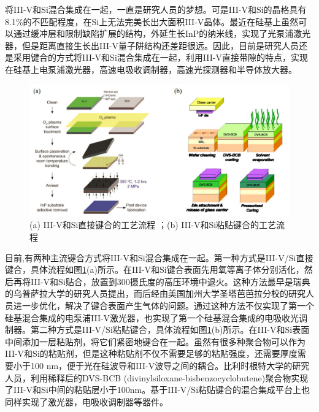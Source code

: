 将III-V和Si混合集成在一起，一直是研究人员的梦想。可是III-V和Si的晶格具有8.1\%的不匹配程度，在Si上无法完美长出大面积III-V晶体。最近在硅基上虽然可以通过缓冲层和限制缺陷扩展的结构，外延生长InP的纳米线，实现了光泵浦激光器\cite{wang2015room}，但是距离直接生长出III-V量子阱结构还差距很远。因此，目前是研究人员还是采用键合的方式将III-V和Si混合集成在一起，利用III-V直接带隙的特点，实现在硅基上电泵浦激光器，高速电吸收调制器，高速光探测器和半导体放大器\cite{liang2010hybrid,roelkens2010iii,liang2010recent,duan2014hybrid}。

\begin{figure}[htb]
	\centering
	\includegraphics[width=14cm]{./Pictures/fig_bonding_methods.jpg}
	\caption{ (a) III-V和Si直接键合的工艺流程 \cite{liang2010hybrid, roelkens2010iii}；(b) III-V和Si粘贴键合的工艺流程 \cite{liang2010hybrid, roelkens2010iii}}
\label{fig_bonding_methods}
\end{figure}

目前,有两种主流键合方式将III-V和Si混合集成在一起。第一种方式是III-V/Si直接键合，具体流程如图\ref{fig_bonding_methods}(a)所示。在III-V和Si键合表面先用氧等离子体分别活化，然后再将III-V和Si贴合，放置到300摄氏度的高压环境中退火。这种方法最早是瑞典的乌普萨拉大学的研究人员提出\cite{pasquariello2002plasma}，而后经由美国加州大学圣塔芭芭拉分校的研究人员进一步优化\cite{liang2010hybrid}，解决了键合表面产生气体的问题。通过这种方法不仅实现了第一个硅基混合集成的电泵浦III-V激光器\cite{fang2006electrically}，也实现了第一个硅基混合集成的电吸收光调制器\cite{kuo2008high}。第二种方式是III-V/Si粘贴键合，具体流程如图\ref{fig_bonding_methods}(b)所示。在III-V和Si表面中间添加一层粘贴剂，将它们紧密地键合在一起。虽然有很多种聚合物可以作为III-V和Si的粘贴剂，但是这种粘贴剂不仅不需要足够的粘贴强度，还需要厚度需要小于100 nm，便于光在硅波导和III-V波导之间的耦合。比利时根特大学的研究人员，利用稀释后的DVS-BCB (divinylsiloxane-bisbenzocyclobutene)聚合物实现了III-V和Si中间的粘贴层小于100nm\cite{liang2010hybrid, roelkens2010iii}。基于III-V/Si粘贴键合的混合集成平台上也同样实现了激光器，电吸收调制器等器件\cite{roelkens2015iii}。

